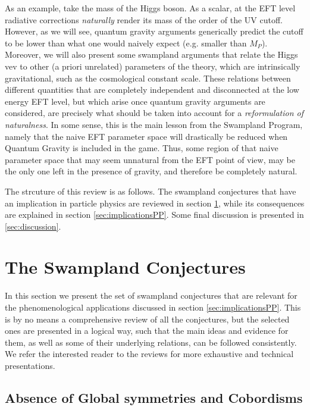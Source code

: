 \documentclass[11pt,a4paper]{article}
\begin{document}
As an example, take the mass of the Higgs boson. As a scalar, at the EFT level radiative corrections \emph{naturally} render its mass of the order of the UV cutoff. However, as we will see, quantum gravity arguments generically predict the cutoff to be lower than what one would naively expect (e.g. smaller than $M_P$). Moreover, we will also present some swampland arguments that relate the Higgs vev to other (a priori unrelated) parameters of the theory, which are intrinsically gravitational, such as the cosmological constant scale. These relations between different quantities that are completely independent and disconnected at the low energy EFT level, but which arise once quantum gravity arguments are considered, are precisely what should be taken into account for a \emph{reformulation of naturalness}. In some sense, this is the main lesson from the Swampland Program, namely that the naive EFT parameter space will drastically  be reduced when Quantum Gravity is included in the game. Thus, some region of that naive parameter space that may seem unnatural from the EFT point of view, may be the only one left in the presence of gravity, and therefore be completely natural.

The strcuture of this review is as follows. The swampland conjectures that have an implication in particle physics are reviewed in section \ref{sec:conjectures}, while its consequences are explained in section \ref{sec:implicationsPP}. Some final discussion is presented in \ref{sec:discussion}.

\section{The Swampland Conjectures}
\label{sec:conjectures}

In this section we present the set of swampland conjectures that are relevant for the phenomenological applications discussed in section \ref{sec:implicationsPP}. This is by no means a comprehensive review of all the conjectures, but the selected ones are presented in a logical way, such that the main ideas and evidence for them, as well as some of their underlying relations, can be followed consistently. We refer the interested reader to the reviews \cite{Brennan:2017rbf,Palti:2019pca,vanBeest:2021lhn} for more exhaustive and technical presentations. 

\subsection{Absence of Global symmetries and Cobordisms}
\label{ss:globalsymmetries}
\end{document}
